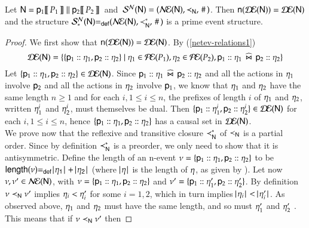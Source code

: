 \begin{theorem}
Let ${\sf N} = {\sf p}_1[\![\,P_1\,]\!] \mathrel{\|} {\sf p}_2[\![\,P_2\,]\!]\,$ and $\,\mathcal{S}^{\mathcal{N}}({\sf N})
=  (\mathcal{N\!E}({\sf N}), \prec _{{\sf N}}, \,\#\,)$. Then  ${\sf n}(\mathcal{D\!E}({\sf N})) =
  \mathcal{D\!E}({\sf N})$ and   the structure $\mathcal{S}_{*}^{\mathcal{N}}({\sf N}) {=_{\sf def}} (\mathcal{N\!E}({\sf N}), \prec^* _{{\sf N}} , \,\#\,)$
is a prime event structure.
\end{theorem}
\begin{proof} 
  We first show that ${\sf n}(\mathcal{D\!E}({\sf N})) = \mathcal{D\!E}({\sf N})$. By
  (\ref{netev-relations1}) 
\[
  \mathcal{D\!E}({\sf N}) =
    \{\{{\sf p}_1:: \eta_1,{\sf p}_2:: \eta_2\} ~|~
      \eta_1 \in \mathcal{P\!E}(P_1), \eta_2 \in \mathcal{P\!E}(P_2),
      {\sf p}_1:: \eta_1\;\,\widehat\Join\;\, {\sf p}_2:: \eta_2\}
\]
Let $\{{\sf p}_1:: \eta_1,{\sf p}_2:: \eta_2\} \in
  \mathcal{D\!E}({\sf N})$. Since
  ${\sf p}_1:: \eta_1\;\,\widehat\Join\;\, {\sf p}_2:: \eta_2$ and
  all the actions in $\eta_1$ involve ${\sf p}_2$ and all the actions
  in $\eta_2$ involve ${\sf p}_1$, we know that $\eta_1$ and
  $\eta_2$ have the same length $n \geq 1$ and for each $i, 1\leq i
  \leq n$, the prefixes of length $i$ of $\eta_1$ and $\eta_2$,
  written $\eta^i_1$ and $\eta^i_2$, must themselves be
  dual. Then
  $\{{\sf p}_1:: \eta^i_1,{\sf p}_2:: \eta^i_2\} \in
  \mathcal{D\!E}({\sf N})$ for each $i, 1\leq i \leq n$, hence
  $\{{\sf p}_1:: \eta_1,{\sf p}_2:: \eta_2\}$ has a
  causal
  set in $\mathcal{D\!E}({\sf N})$.\\
  We prove now that the reflexive and transitive closure $\prec^*
  _{{\sf N}}$ of $\prec _{{\sf N}}$ is a partial order.  Since by definition $\prec^*
  _{{\sf N}}$ is a preorder, we only need to show that it is antisymmetric.
  Define the length of an n-event $\nu =
  \{{\sf p}_1:: \eta_1,{\sf p}_2:: \eta_2\}$ to be
  $\length{\netev} \eqdef \, \cardin{\procev_1} + \cardin{\procev_2}$
  (where $\!\!~|~\! \eta\!~|~\!$ is the length of $\eta$, as
 given by 
). 
 Let now $\nu, \nu'\in \mathcal{N\!E}({\sf N})$, with  $\nu =
\{{\sf p}_1:: \eta_1,{\sf p}_2:: \eta_2\}$ and $\nu'
= \{{\sf p}_1:: \eta'_1,{\sf p}_2:: \eta'_2\}$.  By
definition $\nu \prec _{{\sf N}} \nu'$ implies $\eta_i < \eta'_i$
for some $i=1,2$, which in turn implies $\cardin{\procev_i} <
\cardin{\procev'_i}$.  
 As observed above, 
$\eta_1$ and $\eta_2$ must have the
same length, and so must $\eta'_1$ and $\eta'_2$ . 
This means that if $\nu \prec _{{\sf N}} \nu'$ then

\end{proof}
